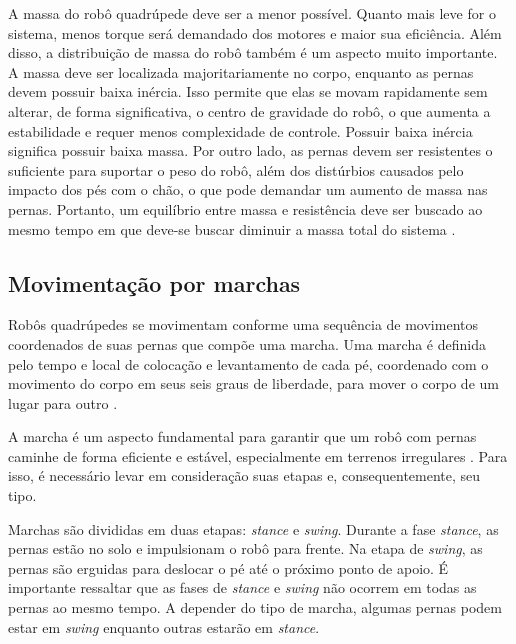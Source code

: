 \documentclass[../main.tex]{subfiles}
\begin{document}
A massa do robô quadrúpede deve ser a menor possível. Quanto mais leve for o sistema, menos torque será demandado dos motores e maior sua eficiência. Além disso, a distribuição de massa do robô também é um aspecto muito importante. A massa deve ser localizada majoritariamente no corpo, enquanto as pernas devem possuir baixa inércia. Isso permite que elas se movam rapidamente sem alterar, de forma significativa, o centro de gravidade do robô, o que aumenta a estabilidade e requer menos complexidade de controle. Possuir baixa inércia significa possuir baixa massa. Por outro lado, as pernas devem ser resistentes o suficiente para suportar o peso do robô, além dos distúrbios causados pelo impacto dos pés com o chão, o que pode demandar um aumento de massa nas pernas. Portanto, um equilíbrio entre massa e resistência deve ser buscado ao mesmo tempo em que deve-se buscar diminuir a massa total do sistema \cite{Zhong2019}.

\subsection{Movimentação por marchas}
Robôs quadrúpedes se movimentam conforme uma sequência de movimentos coordenados de suas pernas que compõe uma marcha. Uma marcha é definida pelo tempo e local de colocação e levantamento de cada pé, coordenado com o movimento do corpo em seus seis graus de liberdade, para mover o corpo de um lugar para outro  \cite{Song1989}.

A marcha é um aspecto fundamental para garantir que um robô com pernas caminhe de forma eficiente e estável, especialmente em terrenos irregulares \cite{X.129}. Para isso, é necessário levar em consideração suas etapas e, consequentemente, seu tipo.

Marchas são divididas em duas etapas: \textit{stance} e \textit{swing}. Durante a fase \textit{stance}, as pernas estão no solo e impulsionam o robô para frente. Na etapa de \textit{swing}, as pernas são erguidas para deslocar o pé até o próximo ponto de apoio. É importante ressaltar que as fases de \textit{stance} e \textit{swing} não ocorrem em todas as pernas ao mesmo tempo. A depender do tipo de marcha, algumas pernas podem estar em \textit{swing} enquanto outras estarão em \textit{stance}.
\end{document}
